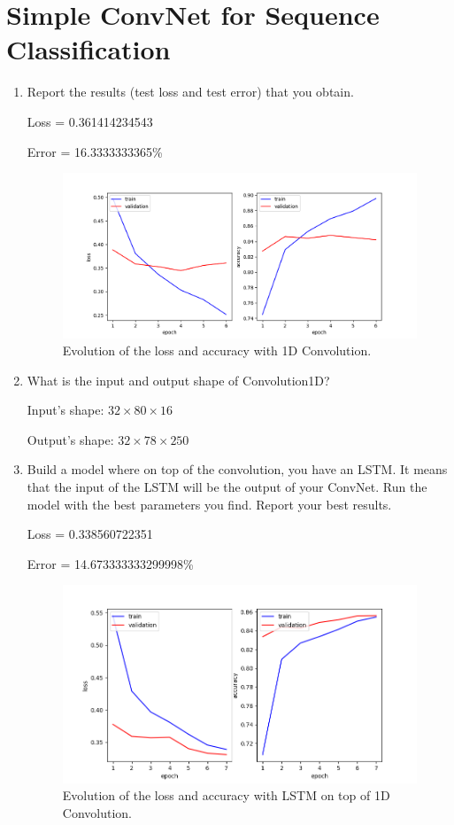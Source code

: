 \documentclass{article} %
\begin{document}
\newpage
\section{Simple ConvNet for Sequence Classification}

\begin{enumerate}
    \item
    Report the results (test loss and test error) that you obtain.

    Loss = 0.361414234543

    Error = 16.3333333365\%

    \begin{figure}[ht]
    \includegraphics[width=\textwidth,height=\textheight,keepaspectratio]{img/cnn_loss_acc.png}
    \caption{Evolution of the loss and accuracy with 1D Convolution.}
    \end{figure}

    \item
    What is the input and output shape of Convolution1D?

    Input's shape: $32 \times 80 \times 16$

    Output's shape: $32 \times 78 \times 250$

    \item
    Build a model where on top of the convolution, you have an LSTM. It means
    that the input of the LSTM will be the output of your ConvNet. Run the model
    with the best parameters you find. Report your best results.

    Loss = 0.338560722351

    Error = 14.673333333299998\%

    \begin{figure}[ht]
    \includegraphics[width=\textwidth,height=\textheight,keepaspectratio]{img/cnn_lstm_loss_acc.png}
    \caption{Evolution of the loss and accuracy with LSTM on top of 1D Convolution.}
    \end{figure}
\end{enumerate}
\end{document}
